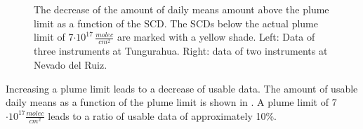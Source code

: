 \begin{figure}
	\centering
	\caption{The decrease of the amount of daily means amount above the plume limit as a function of the  SCD. The  SCDs below the actual plume limit of 7$\cdot10^{17}\,\frac{molec}{cm^2}$ are marked with a yellow shade. Left: Data of three instruments at Tungurahua. Right: data of two instruments at Nevado del Ruiz.}
	\label{fig:percentageminso2}
\end{figure}
Increasing a plume limit leads to a decrease of usable data. The amount of usable  daily means as a function of the plume limit is shown in . A plume limit of 7$\cdot10^{17}\frac{molec}{cm^2}$ leads to a ratio of usable data of approximately 10\%.


